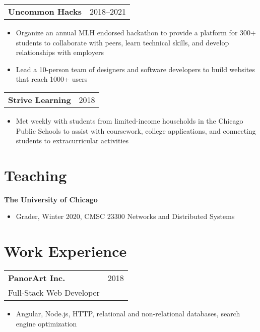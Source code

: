 \documentclass[letterpaper, 11pt]{article}
\begin{document}
\begin{tabular}{@{} L{12cm} @{} R{4.51cm} @{}}
  \textbf{Uncommon Hacks} & 2018--2021\\
\end{tabular}
\begin{itemize}
\item Organize an annual MLH endorsed hackathon to provide a platform for 300+
  students to collaborate with peers, learn technical skills,
  and develop relationships with employers
\item Lead a 10-person team of designers and software developers
  to build websites that reach 1000+ users
\end{itemize}

\begin{tabular}{@{} L{12cm} @{} R{4.51cm} @{}}
  \textbf{Strive Learning} & 2018\\
\end{tabular}
\begin{itemize}
\item Met weekly with students from limited-income households in the Chicago Public Schools
  to assist with coursework, college applications, and connecting
  students to extracurricular activities
\end{itemize}

\section{Teaching}
\textbf{The University of Chicago}
\begin{itemize}
  \item Grader, Winter 2020, CMSC 23300 Networks and Distributed Systems
\end{itemize}

\section{Work Experience}
\begin{tabular}{@{} L{12cm} @{} R{4.51cm} @{}}
  \textbf{PanorArt Inc.} & 2018 \\
  Full-Stack Web Developer\\
\end{tabular}
\begin{itemize}
\item Angular, Node.js, HTTP, relational and non-relational databases, search engine optimization
\end{itemize}
\end{document}
